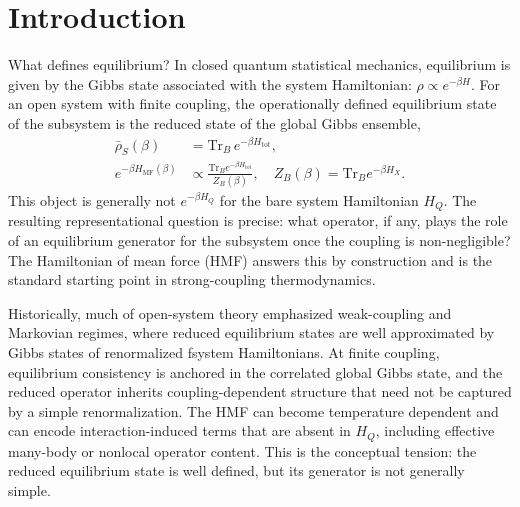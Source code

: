 \section{Introduction}
\label{sec:intro}

What defines equilibrium? In closed quantum statistical mechanics, equilibrium is given by the Gibbs state associated with the system Hamiltonian: $\rho \propto e^{-\beta H}$. For an open system with finite coupling, the operationally defined equilibrium state of the subsystem is the
reduced state of the global Gibbs ensemble,
\begin{align}
    \bar{\rho}_S(\beta)
    &= \mathrm{Tr}_B\, e^{-\beta H_{\mathrm{tot}}},
    \label{eq:intro_rho_unnorm} \\
    e^{-\beta H_{\mathrm{MF}}(\beta)}
    &\propto \frac{\mathrm{Tr}_B e^{-\beta H_{\mathrm{tot}}}}{Z_B(\beta)},
    \quad Z_B(\beta) = \mathrm{Tr}_B e^{-\beta H_X}.
    \label{eq:intro_hmf_def}
\end{align}
This object is generally not $e^{-\beta H_Q}$ for the bare system Hamiltonian
$H_Q$. The resulting representational question is precise: what operator, if
any, plays the role of an equilibrium generator for the subsystem once the
coupling is non-negligible? The Hamiltonian of mean force (HMF) answers this by
construction and is the standard starting point in strong-coupling
thermodynamics\cite{campisiFluctuationTheoremArbitrary2009,talknerColloquiumStatisticalMechanics2020,trushechkinOpenQuantumSystem2022,seifertFirstSecondLaw2016}.

Historically, much of open-system theory emphasized weak-coupling and Markovian
regimes, where reduced equilibrium states are well approximated by Gibbs states
of renormalized fsystem Hamiltonians. At finite coupling, equilibrium
consistency is anchored in the correlated global Gibbs state, and the reduced
operator inherits coupling-dependent structure that need not be captured by a
simple renormalization. The HMF can become temperature dependent and can encode
interaction-induced terms that are absent in $H_Q$, including effective
many-body or nonlocal operator content\cite{talknerColloquiumStatisticalMechanics2020,seifertFirstSecondLaw2016,espositoNatureHeatStrongly2015,hanggiFiniteQuantumDissipation2008,ingoldSpecificHeatAnomalies2009,correaPotentialRenormalisationLamb2025}.
This is the conceptual tension: the reduced equilibrium state is well defined,
but its generator is not generally simple.

